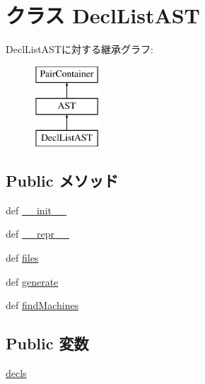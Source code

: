 \hypertarget{classslicc_1_1ast_1_1DeclListAST_1_1DeclListAST}{
\section{クラス DeclListAST}
\label{classslicc_1_1ast_1_1DeclListAST_1_1DeclListAST}
}
DeclListASTに対する継承グラフ:\begin{figure}[H]
\begin{center}
\leavevmode
\includegraphics[height=3cm]{classslicc_1_1ast_1_1DeclListAST_1_1DeclListAST}
\end{center}
\end{figure}
\subsection*{Public メソッド}
\begin{DoxyCompactItemize}
\item 
def \hyperlink{classslicc_1_1ast_1_1DeclListAST_1_1DeclListAST_ac775ee34451fdfa742b318538164070e}{\_\-\_\-init\_\-\_\-}
\item 
def \hyperlink{classslicc_1_1ast_1_1DeclListAST_1_1DeclListAST_ad8b9328939df072e4740cd9a63189744}{\_\-\_\-repr\_\-\_\-}
\item 
def \hyperlink{classslicc_1_1ast_1_1DeclListAST_1_1DeclListAST_a35b1a87f6fcbddeb5b793b0e415765f8}{files}
\item 
def \hyperlink{classslicc_1_1ast_1_1DeclListAST_1_1DeclListAST_a4555d1cee0dccf3942ea35fe86de2e8e}{generate}
\item 
def \hyperlink{classslicc_1_1ast_1_1DeclListAST_1_1DeclListAST_a716f8a2874cc6a4d0c5ed3c2f90f236d}{findMachines}
\end{DoxyCompactItemize}
\subsection*{Public 変数}
\begin{DoxyCompactItemize}
\item 
\hyperlink{classslicc_1_1ast_1_1DeclListAST_1_1DeclListAST_a0bfd0c6209d776dae593ee7c78d9aed8}{decls}
\end{DoxyCompactItemize}


